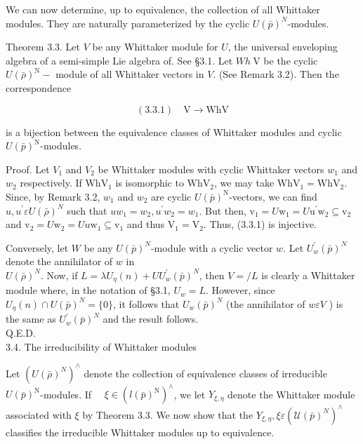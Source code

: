\documentclass[10pt]{article}
\begin{document}
We can now determine, up to equivalence, the collection of all Whittaker modules. They are naturally parameterized by the cyclic $U(\bar{p})^{N}$-modules.

Theorem 3.3. Let $V$ be any Whittaker module for $U$, the universal enveloping algebra of a semi-simple Lie algebra of. See §3.1. Let $W h \mathrm{~V}$ be the cyclic $U(\bar{\rho})^{\mathrm{N}}-$ module of all Whittaker vectors in $V$. (See Remark 3.2). Then the correspondence

$$
(3.3 .1) \quad \mathrm{V} \rightarrow \mathrm{WhV}
$$

is a bijection between the equivalence classes of Whittaker modules and cyclic $U(\bar{p})^{\mathrm{N}}$-modules.

Proof. Let $V_{1}$ and $V_{2}$ be Whittaker modules with cyclic Whittaker vectors $w_{1}$ and $w_{2}$ respectively. If $\mathrm{WhV}_{1}$ is isomorphic to $\mathrm{WhV}_{2}$, we may take $\mathrm{WhV}_{1}=\mathrm{WhV}_{2}$. Since, by Remark 3.2, $w_{1}$ and $w_{2}$ are cyclic $U(\bar{p})^{\mathrm{N}}$-vectors, we can find $u, u^{\prime} \varepsilon U(\bar{\rho})^{N}$ such that $u w_{1}=w_{2}, u^{\prime} w_{2}=w_{1}$. But then, $\mathrm{v}_{1}=U \mathrm{w}_{1}=U \mathrm{u}^{\prime} \mathrm{w}_{2} \subseteq \mathrm{v}_{2}$ and $\mathrm{v}_{2}=U \mathrm{w}_{2}=U u \mathrm{w}_{1} \subseteq \mathrm{v}_{1}$ and thus $\mathrm{V}_{1}=\mathrm{V}_{2}$. Thus, (3.3.1) is injective.

Conversely, let $W$ be any $U(\bar{p})^{N}$-module with a cyclic vector $w$. Let $U_{w}^{\prime}(\bar{p})^{N}$ denote the annihilator of $w$ in\\
$U(\bar{\rho})^{N}$. Now, if $L=\lambda U_{\eta}(n)+U U_{w}^{\prime}(\bar{p})^{N}$, then $V=/ L$ is clearly a Whittaker module where, in the notation of §3.1, $U_{w}=L$. However, since $U_{\eta}(n) \cap U(\bar{p})^{N}=\{0\}$, it follows that $U_{w}(\bar{p})^{N}$ (the annihilator of $w \varepsilon V$ ) is the same as $U_{w}^{\prime}(\bar{p})^{N}$ and the result follows.\\
Q.E.D.\\
3.4. The irreducibility of Whittaker modules

Let $\left(U(\bar{\rho})^{N}\right)^{\wedge}$ denote the collection of equivalence classes of irreducible $U(\bar{p})^{\mathrm{N}}$-modules. If $\quad \xi \in\left(l(\bar{p})^{\mathrm{N}}\right)^{\wedge}$, we let $Y_{\xi, \eta}$ denote the Whittaker module associated with $\xi$ by Theorem 3.3. We now show that the $Y_{\xi, \eta}, \xi \varepsilon\left(\mathcal{U}(\bar{p})^{N}\right)^{\wedge}$ classifies the irreducible Whittaker modules up to equivalence.
\end{document}
